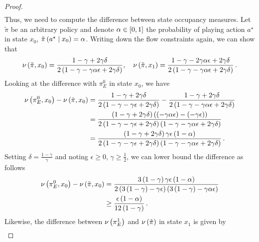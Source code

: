\begin{proof}
\begin{align}
    \end{align}
    Thus, we need to compute the difference between state occupancy measures. Let $\tilde\pi$ be an arbitrary policy and denote $\alpha \in \left[ 0, 1 \right]$ the probability of playing action $a^\star$ in state $x_0$, \ie $\tilde\pi \left( a^\star \mathrel{}\middle|\mathrel{} x_0 \right) = \alpha$. Writing down the flow constraints again, we can show that
    \begin{equation*}
        \nu \left( \tilde\pi, x_0 \right) = \frac{1 - \gamma + 2 \gamma \delta}{2 \left( 1 - \gamma - \gamma \alpha \epsilon + 2 \gamma \delta \right)}, \quad \nu \left( \tilde\pi, x_1 \right) = \frac{1 - \gamma - 2 \gamma \alpha \epsilon + 2 \gamma \delta}{2 \left( 1 - \gamma - \gamma \alpha \epsilon + 2 \gamma \delta \right)}\,.
    \end{equation*}
    Looking at the difference with $\pi_E^0$ in state $x_0$, we have
    \begin{align*}
        \nu \left( \pi_E^0, x_0 \right) - \nu \left( \tilde\pi, x_0 \right) &= \frac{1 - \gamma + 2 \gamma \delta}{2 \left( 1 - \gamma - \gamma \epsilon + 2 \gamma \delta \right)} - \frac{1 - \gamma + 2 \gamma \delta}{2 \left( 1 - \gamma - \gamma \alpha \epsilon + 2 \gamma \delta \right)} \\
        &= \frac{\left( 1 - \gamma + 2 \gamma \delta \right) \left( \left( - \gamma \alpha \epsilon \right) - \left( - \gamma \epsilon \right) \right)}{2 \left( 1 - \gamma - \gamma \epsilon + 2 \gamma \delta \right) \left( 1 - \gamma - \gamma \alpha \epsilon + 2 \gamma \delta \right)} \\
        &= \frac{\left( 1 - \gamma + 2 \gamma \delta \right) \gamma \epsilon \left( 1 - \alpha \right)}{2 \left( 1 - \gamma - \gamma \epsilon + 2 \gamma \delta \right) \left( 1 - \gamma - \gamma \alpha \epsilon + 2 \gamma \delta \right)}\,.
    \end{align*}
    Setting $\delta = \frac{1 - \gamma}{\gamma}$ and noting $\epsilon \geq 0$, $\gamma \geq \frac12$, we can lower bound the difference as follows
    \begin{align}
        \nu \left( \pi_E^0, x_0 \right) - \nu \left( \tilde\pi, x_0 \right) &= \frac{3 \left( 1 - \gamma \right) \gamma \epsilon \left( 1 - \alpha \right)}{2 \left( 3 \left( 1 - \gamma \right) - \gamma \epsilon \right) \left( 3 \left( 1 - \gamma \right) - \gamma \alpha \epsilon \right)} \nonumber \\
        &\geq \frac{\epsilon \left( 1 - \alpha \right)}{12 \left( 1 - \gamma \right)}\,. \label{eq:appE2-diffx0}
    \end{align}
    Likewise, the difference between $\nu \left( \pi_E^1 \right)$ and $\nu \left( \tilde\pi \right)$ in state $x_1$ is given by
    \begin{align*}

\end{align*}
\end{proof}
